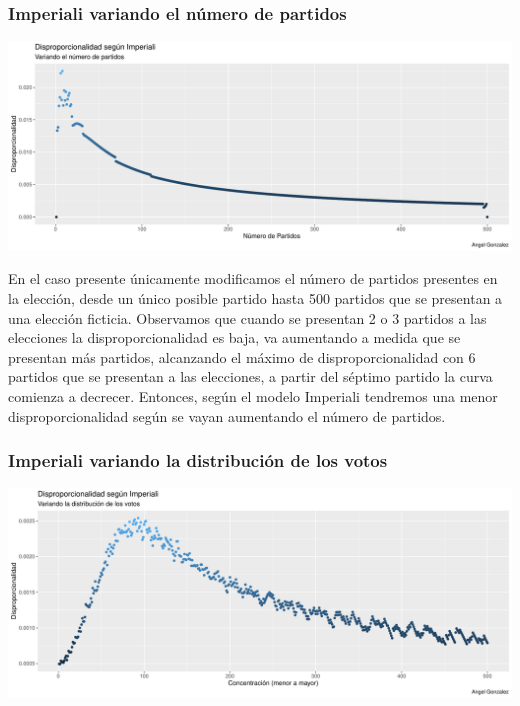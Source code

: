 \documentclass[12pt,a4paper,]{book}
\numberwithin{dummy}{section}
\theoremstyle{ocrenumbox}
\theoremstyle{blacknumex}
\theoremstyle{blacknumbox}
\theoremstyle{ocrenum}
\theoremstyle{ocrenum}
\begin{document}
\hypertarget{imperiali-variando-el-nuxfamero-de-partidos}{%
\subsubsection{Imperiali variando el número de
partidos}\label{imperiali-variando-el-nuxfamero-de-partidos}}

\begin{center}\includegraphics[width=0.95\linewidth]{figurasR/unnamed-chunk-25-1} \end{center}

En el caso presente únicamente modificamos el número de partidos
presentes en la elección, desde un único posible partido hasta 500
partidos que se presentan a una elección ficticia. Observamos que cuando
se presentan 2 o 3 partidos a las elecciones la disproporcionalidad es
baja, va aumentando a medida que se presentan más partidos, alcanzando
el máximo de disproporcionalidad con 6 partidos que se presentan a las
elecciones, a partir del séptimo partido la curva comienza a decrecer.
Entonces, según el modelo Imperiali tendremos una menor
disproporcionalidad según se vayan aumentando el número de partidos.

\hypertarget{imperiali-variando-la-distribuciuxf3n-de-los-votos}{%
\subsubsection{Imperiali variando la distribución de los
votos}\label{imperiali-variando-la-distribuciuxf3n-de-los-votos}}

\begin{center}\includegraphics[width=0.95\linewidth]{figurasR/unnamed-chunk-26-1} \end{center}
\end{document}
